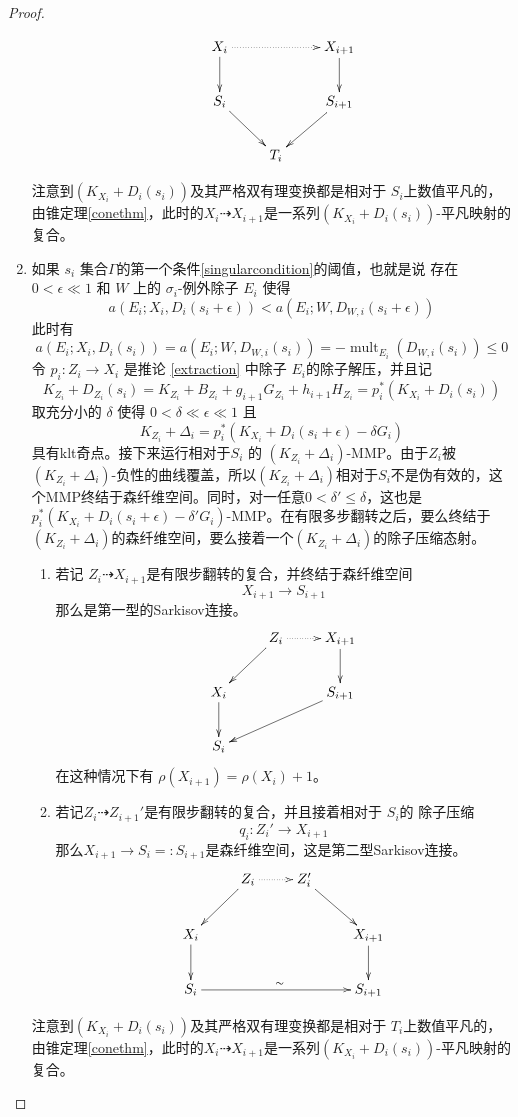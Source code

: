\begin{proof}
\begin{enumerate}
\begin{enumerate}
      \[ \xymatrix{
          X_{i}\ar@{.>}[rr]\ar[d]& &X_{i+1}\ar[d] \\
          S_{i}\ar[rd]& & S_{i+1}\ar[ld]\\
             &T_{i}& } \]
  \end{enumerate}
  注意到$ (K_{X_{i}}+D_{i}(s_{i})) $及其严格双有理变换都是相对于 $S_{i}$上数值平凡的，由锥定理\ref{conethm}，此时的$X_{i}\dashrightarrow X_{i+1}$是一系列$ (K_{X_{i}}+D_{i}(s_{i}))$-平凡映射的复合。
    \item 如果 $s_{i}$ 集合$\Gamma$的第一个条件\ref{singularcondition}的阈值，也就是说 存在  $0<\epsilon \ll 1$ 和 $W$ 上的  $\sigma_{i}$-例外除子 $E_{i}$ 使得
  \[ a(E_{i};X_{i},D_{i}(s_{i}+\epsilon))< a(E_{i};W,D_{W,i}(s_{i}+\epsilon)) \]
  此时有
  \[ a(E_{i};X_{i},D_{i}(s_{i}))= a(E_{i};W,D_{W,i}(s_{i}))=-\operatorname{mult}_{E_{i}}(D_{W,i}(s_{i}))\leqslant 0 \]
  令 $p_{i}:Z_{i}\to X_{i}$ 是推论 \ref{extraction} 中除子 $E_{i}$的除子解压，并且记
  \[K_{Z_{i}}+D_{Z_{i}}(s_{i})=K_{Z_{i}}+B_{Z_{i}}+g_{i+1}G_{Z_{i}}+h_{i+1}H_{Z_{i}}=p_{i}^*\left(K_{X_{i}}+D_{i}\left(s_{i}\right)\right)\]
  取充分小的 $\delta$ 使得 $0<\delta \ll \epsilon \ll 1$ 且
  \[ K_{Z_{i}}+\Delta_{i}=p_{i}^*(K_{X_{i}}+D_{i}(s_{i}+\epsilon)-\delta G_{i}) \]
  具有klt奇点。接下来运行相对于$S_{i}$ 的 $(K_{Z_{i}}+\Delta_{i})$-MMP。由于$Z_{i}$被$(K_{Z_{i}}+\Delta_{i})$-负性的曲线覆盖，所以$(K_{Z_{i}}+\Delta_{i})$相对于$S_{i}$不是伪有效的，这个MMP终结于森纤维空间。同时，对一任意$0<\delta'\leqslant\delta$，这也是$p_{i}^*(K_{X_{i}}+D_{i}(s_{i}+\epsilon)-\delta'G_{i})$-MMP。在有限多步翻转之后，要么终结于$(K_{Z_{i}}+\Delta_{i})$的森纤维空间，要么接着一个$(K_{Z_{i}}+\Delta_{i})$的除子压缩态射。
  \begin{enumerate}
    \item 若记 $Z_{i}\dashrightarrow X_{i+1}$是有限步翻转的复合，并终结于森纤维空间
      \[X_{i+1}\to S_{i+1}\]
      那么是第一型的Sarkisov连接。 
      \[ \xymatrix{
        &Z_{i}\ar@{.>}[r]\ar[ld] &X_{i+1}\ar[d] \\
          X_{i}\ar[d]& &S_{i+1}\ar[lld]\\
          S_{i}   & & } \]
      在这种情况下有 $\rho(X_{i+1})=\rho(X_{i})+1$。
    \item 若记$Z_{i}\dashrightarrow Z_{i+1}'$是有限步翻转的复合，并且接着相对于 $S_{i}$的 除子压缩
      \[q_{i}:Z_{i}'\to X_{i+1}\]
     那么$X_{i+1}\to S_{i}=:S_{i+1}$是森纤维空间，这是第二型Sarkisov连接。
      \[ \xymatrix{
        &Z_{i}\ar@{.>}[r]\ar[ld] &Z_{i}'\ar[rd] \\
          X_{i}\ar[d]& & &X_{i+1}\ar[d]\\
          S_{i}\ar[rrr]^{\sim}   & & & S_{i+1} } \]
  \end{enumerate}
  注意到$ (K_{X_{i}}+D_{i}(s_{i})) $及其严格双有理变换都是相对于 $T_{i}$上数值平凡的，由锥定理\ref{conethm}，此时的$X_{i}\dashrightarrow X_{i+1}$是一系列$ (K_{X_{i}}+D_{i}(s_{i}))$-平凡映射的复合。
\end{enumerate}
\end{proof}

